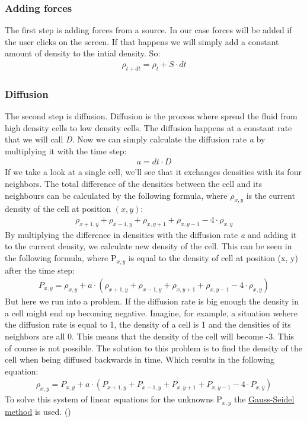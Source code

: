 \documentclass[a4paper,12pt,titlepage]{article}
\begin{document}
\subsubsection{Adding forces}
The first step is adding forces from a source. In our case forces will be added if the user clicks on the screen.
If that happens we will simply add a constant amount of density to the intial density. So:
\[
\begin{array}{ll}
  \rho_{t+dt} = \rho_t + S \cdot dt
\end{array}
\]

\subsubsection{Diffusion}
The second step is diffusion.
Diffusion is the process where spread the fluid from high density cells to low density cells.
The diffusion happens at a constant rate that we will call \textit{D}. 
Now we can simply calculate the diffusion rate \textit{a} by multiplying it with the time step:
\[
\begin{array}{ll}
  a = dt \cdot D
\end{array}
\]
If we take a look at a single cell, we'll see that it exchanges densities with its four neighbors.
The total difference of the densities between the cell and its neighbours can be calculated by the following formula,
where $\rho_{x, y}$ is the current density of the cell at position $(x, y)$:
\[
\begin{array}{ll}
	\rho_{x+1, y} + \rho_{x-1, y} + \rho_{x, y+1} + \rho_{x, y-1} - 4 \cdot \rho_{x, y}
\end{array}
\]
By multiplying the difference in densities with the diffusion rate \textit{a} and adding it to the current density, we calculate new density of the cell. 
This can be seen in the following formula, where P$_{x, y}$ is equal to the density of cell at position (x, y) after the time step:
\[
\begin{array}{ll}
	P_{x, y} = \rho_{x, y} + a \cdot (\rho_{x+1, y} + \rho_{x-1, y} + \rho_{x, y+1} + \rho_{x, y-1} - 4 \cdot \rho_{x, y})
\end{array}
\]
But here we run into a problem. If the diffusion rate is big enough the density in a cell might end up becoming negative.
Imagine, for example, a situation wehere the diffusion rate is equal to 1,  the density of a cell is 1 and the densities of its neighbors are all 0. This means that the density of the cell will become -3.
This of course is not possible.
The solution to this problem is to find the density of the cell when being diffused backwards in time. Which results in the following equation:
\[
\begin{array}{ll}
	\rho_{x, y} = P_{x, y} + a \cdot (P_{x+1, y} + P_{x-1, y} + P_{x, y+1} + P_{x, y-1} - 4 \cdot P_{x, y})
\end{array}	
\]
To solve this system of linear equations for the unknowns P$_{x, y}$ the \href{https://en.wikipedia.org/wiki/Gauss–Seidel_method}{Gauss-Seidel method} is used. (\cite{josstam})
\end{document}
